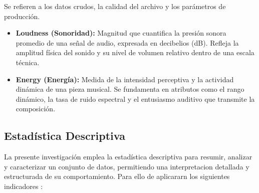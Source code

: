 \documentclass[oneside,11pt]{Latex/Classes/PhDthesisPSnPDF}
\begin{document}
Se refieren a los datos crudos, la calidad del archivo y los parámetros
de producción.

\begin{itemize}
\item
  \textbf{Loudness (Sonoridad):} Magnitud que cuantifica la presión
  sonora promedio de una señal de audio, expresada en decibelios (dB).
  Refleja la amplitud física del sonido y su nivel de volumen relativo
  dentro de una escala técnica.
\item
  \textbf{Energy (Energía):} Medida de la intensidad perceptiva y la
  actividad dinámica de una pieza musical. Se fundamenta en atributos
  como el rango dinámico, la tasa de ruido espectral y el entusiasmo
  auditivo que transmite la composición.
\end{itemize}

\subsection{Estadística Descriptiva}

La presente investigación emplea la estadística descriptiva para
resumir, analizar y caracterizar un conjunto de datos, permitiendo una
interpretacion detallada y estructurada de su comportamiento. Para ello
de aplicararn los siguientes indicadores :
\end{document}
